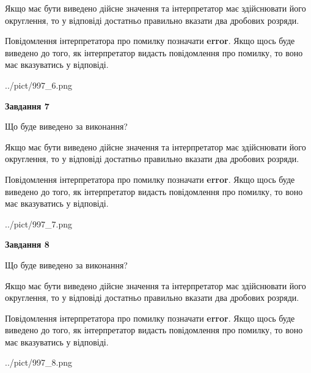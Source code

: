 \documentclass[12pt, ukrainian]{article}
\begin{document}
{\begin {Large}
Якщо має бути виведено дійсне значення та інтерпретатор має здійснювати його округлення, 
то у відповіді достатньо правильно вказати два дробових розряди.

Повідомлення інтерпретатора про помилку позначати \textbf{error}.
Якщо щось буде виведено до того, як інтерпретатор видасть повідомлення про помилку, 
то воно має вказуватись у відповіді. \par

\begin{center}
	{../pict/997_6.png}
\end{center}
\newpage

{\begin {center}\textbf{Завдання 7}\end {center}}\par
Що буде виведено за виконання? \par

Якщо має бути виведено дійсне значення та інтерпретатор має здійснювати його округлення, 
то у відповіді достатньо правильно вказати два дробових розряди.

Повідомлення інтерпретатора про помилку позначати \textbf{error}.
Якщо щось буде виведено до того, як інтерпретатор видасть повідомлення про помилку, 
то воно має вказуватись у відповіді. \par

\begin{center}
	{../pict/997_7.png}
\end{center}
\newpage

{\begin {center}\textbf{Завдання 8}\end {center}}\par
Що буде виведено за виконання? \par

Якщо має бути виведено дійсне значення та інтерпретатор має здійснювати його округлення, 
то у відповіді достатньо правильно вказати два дробових розряди.

Повідомлення інтерпретатора про помилку позначати \textbf{error}.
Якщо щось буде виведено до того, як інтерпретатор видасть повідомлення про помилку, 
то воно має вказуватись у відповіді. \par

\begin{center}
	{../pict/997_8.png}
\end{center}
\newpage


\end{Large}}
\end{document}
